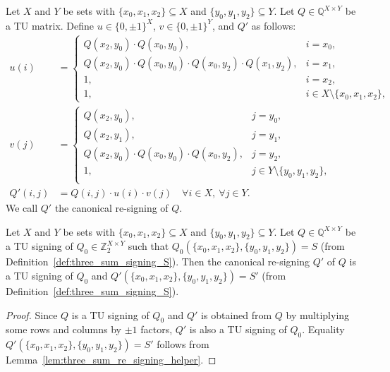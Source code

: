 \begin{definition}\label{def:three_sum_re_signing}
    Let $X$ and $Y$ be sets with $\{x_{0}, x_{1}, x_{2}\} \subseteq X$ and $\{y_{0}, y_{1}, y_{2}\} \subseteq Y$. Let $Q \in \mathbb{Q}^{X \times Y}$ be a TU matrix. Define $u \in \{0, \pm 1\}^{X}$, $v \in \{0, \pm 1\}^{Y}$, and $Q'$ as follows:
    \begin{align*}
        u(i) &= \begin{cases}
            Q (x_{2}, y_{0}) \cdot Q (x_{0}, y_{0}), & i = x_{0}, \\
            Q (x_{2}, y_{0}) \cdot Q (x_{0}, y_{0}) \cdot Q (x_{0}, y_{2}) \cdot Q (x_{1}, y_{2}), & i = x_{1}, \\
            1, & i = x_{2}, \\
            1, & i \in X \setminus \{x_{0}, x_{1}, x_{2}\},
        \end{cases} \\
        v(j) &= \begin{cases}
            Q (x_{2}, y_{0}), & j = y_{0}, \\
            Q (x_{2}, y_{1}), & j = y_{1}, \\
            Q (x_{2}, y_{0}) \cdot Q (x_{0}, y_{0}) \cdot Q (x_{0}, y_{2}), & j = y_{2}, \\
            1, & j \in Y \setminus \{y_{0}, y_{1}, y_{2}\}, \\
        \end{cases} \\
        Q' (i, j) &= Q (i, j) \cdot u(i) \cdot v(j) \quad \forall i \in X, \ \forall j \in Y.
    \end{align*}
    We call $Q'$ the canonical re-signing of $Q$.
\end{definition}

\begin{lemma}\label{lem:three_sum_re_signing_apply}
    Let $X$ and $Y$ be sets with $\{x_{0}, x_{1}, x_{2}\} \subseteq X$ and $\{y_{0}, y_{1}, y_{2}\} \subseteq Y$. Let $Q \in \mathbb{Q}^{X \times Y}$ be a TU signing of $Q_{0} \in \mathbb{Z}_{2}^{X \times Y}$ such that $Q_{0} (\{x_{0}, x_{1}, x_{2}\}, \{y_{0}, y_{1}, y_{2}\}) = S$ (from Definition~\ref{def:three_sum_signing_S}). Then the canonical re-signing $Q'$ of $Q$ is a TU signing of $Q_{0}$ and $Q' (\{x_{0}, x_{1}, x_{2}\}, \{y_{0}, y_{1}, y_{2}\}) = S'$ (from Definition~\ref{def:three_sum_signing_S}).
\end{lemma}

\begin{proof}
    Since $Q$ is a TU signing of $Q_{0}$ and $Q'$ is obtained from $Q$ by multiplying some rows and columns by $\pm 1$ factors, $Q'$ is also a TU signing of $Q_{0}$. Equality $Q' (\{x_{0}, x_{1}, x_{2}\}, \{y_{0}, y_{1}, y_{2}\}) = S'$ follows from Lemma~\ref{lem:three_sum_re_signing_helper}.
\end{proof}


